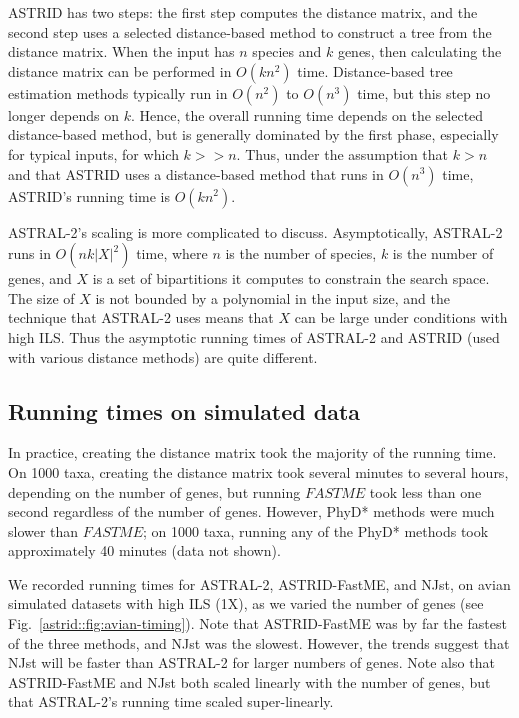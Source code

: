 ASTRID has two steps: the first step computes the distance matrix, and
the second step uses a selected distance-based method to construct a
tree from the distance matrix.  When the input has $n$ species and $k$
genes, then calculating the distance matrix can be performed in
$O(kn^2)$ time.  Distance-based tree estimation methods typically run
in $O(n^2)$  to $O(n^3)$ time, but this step no longer depends on $k$.
Hence, the overall running time depends on the selected distance-based
method, but is generally dominated by the first phase, especially for
typical inputs, for which $k >> n$. Thus, under the assumption that
$k > n$ and that ASTRID uses a distance-based
method that runs in $O(n^3)$ time, ASTRID’s running time is $O(kn^2)$.

ASTRAL-2's scaling is more complicated to discuss.
Asymptotically, ASTRAL-2 runs in $O(n k |X|^2)$ time, where
$n$ is the number of species, $k$ is the number of genes, and $X$ is
a set of bipartitions it computes to constrain
the search space. The size of $X$ is not bounded by a polynomial
in the input size, and the technique that ASTRAL-2 uses
means that $X$ can be large under conditions with
high ILS. 
Thus the asymptotic running times of ASTRAL-2 and ASTRID (used with
various distance methods) are quite 
different. 

\subsection{Running times on simulated data}
In practice, creating the distance matrix took the majority of the
running time. On 1000 taxa, creating the distance matrix took several
minutes to several hours, depending on the number of genes, but
running $FASTME$ took less than one second regardless of the number of
genes. However,  PhyD* methods were much
slower than $FASTME$; on 1000 taxa, running any of the PhyD* methods
took approximately 40 minutes (data not shown).




We recorded running
times for ASTRAL-2, 
ASTRID-FastME, and NJst, 
on avian 
simulated datasets with high ILS (1X),
as
we varied the number of genes (see Fig.~\ref{astrid::fig:avian-timing}).
Note that ASTRID-FastME was by far the fastest of the three
methods, and NJst was the slowest. However, the trends suggest
that NJst will be faster than ASTRAL-2 for larger numbers of genes.
Note also that ASTRID-FastME and NJst both scaled linearly with the
number of genes, but that ASTRAL-2’s running time scaled super-linearly.

